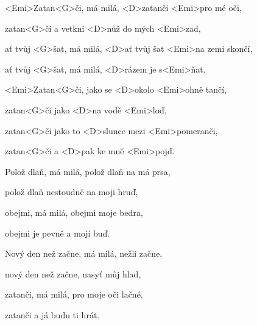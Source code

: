 

\zs
<Emi>Zatan<G>či, má milá, <D>zatanči <Emi>pro mé oči,

zatan<G>či a vetkni <D>nůž do mých <Emi>zad,

ať tvůj <G>šat, má milá, <D>ať tvůj šat <Emi>na zemi skončí,

ať tvůj <G>šat, má milá, <D>rázem je s<Emi>ňat.
\ks

\zr
<Emi>Zatan<G>či, jako se <D>okolo <Emi>ohně tančí,

zatan<G>či jako <D>na vodě <Emi>loď,

zatan<G>či jako to <D>slunce mezi <Emi>pomeranči,

zatan<G>či a <D>pak ke mně <Emi>pojď.
\kr

\zs
Polož dlaň, má milá, polož dlaň na má prsa,

polož dlaň nestoudně na moji hruď,

obejmi, má milá, obejmi moje bedra,

obejmi je pevně a mojí buď.
\ks

\zr \kr

\zs
Nový den než začne, má milá, nežli začne,

nový den než začne, nasyť můj hlad,

zatanči, má milá, pro moje oči lačné,

zatanči a já budu ti hrát.
\ks

\zr \kr

\zr \kr

\kp






